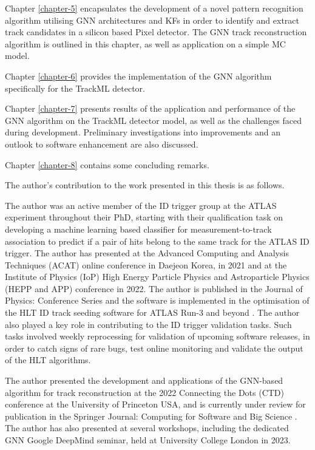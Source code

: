 Chapter \ref{chapter-5} encapsulates the development of a novel pattern recognition algorithm utilising \acs{GNN} architectures and \ac{KF}s in order to identify and extract track candidates in a silicon based Pixel detector. The \acs{GNN} track reconstruction algorithm is outlined in this chapter, as well as application on a simple \ac{MC} model.

Chapter \ref{chapter-6} provides the implementation of the \acs{GNN} algorithm specifically for the TrackML detector.

Chapter \ref{chapter-7} presents results of the application and performance of the \acs{GNN} algorithm on the TrackML detector model, as well as the challenges faced during development. Preliminary investigations into improvements and an outlook to software enhancement are also discussed.

Chapter \ref{chapter-8} contains some concluding remarks.

The author’s contribution to the work presented in this thesis is as follows.

The author was an active member of the \ac{ID} trigger group at the ATLAS experiment throughout their PhD, starting with their qualification task on developing a machine learning based classifier for measurement-to-track association to predict if a pair of hits belong to the same track for the ATLAS ID trigger. The author has presented at the Advanced Computing and Analysis Techniques (ACAT) online conference in Daejeon Korea, in 2021 and at the Institute of Physics (IoP) High Energy Particle Physics and Astroparticle Physics (HEPP and APP) conference in 2022. The author is published in the Journal of Physics: Conference Series \cite{Lad_2023} and the software is implemented in the optimisation of the \ac{HLT} ID track seeding software for ATLAS Run-3 and beyond \cite{Grandi:2728111, Long:2813981}. The author also played a key role in contributing to the ID trigger validation tasks. Such tasks involved weekly reprocessing for validation of upcoming software releases, in order to catch signs of rare bugs, test online monitoring and validate the output of the \ac{HLT} algorithms.

The author presented the development and applications of the GNN-based algorithm for track reconstruction at the 2022 Connecting the Dots (CTD) conference at the University of Princeton USA, and is currently under review for publication in the Springer Journal: Computing for Software and Big Science \cite{Lad_2023_gnn}. The author has also presented at several workshops, including the dedicated \acs{GNN} Google DeepMind seminar, held at University College London in 2023.

